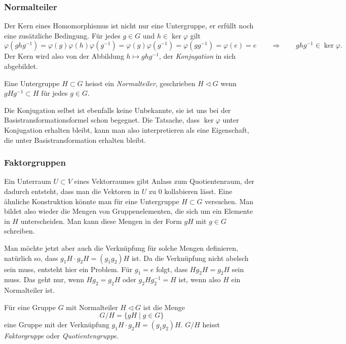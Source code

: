 \subsubsection{Normalteiler}
Der Kern eines Homomorphismus ist nicht nur eine Untergruppe, er erfüllt
noch eine zusätzliche Bedingung. 
Für jedes $g\in G$ und $h\in\ker\varphi$ gilt 
\[
\varphi(ghg^{-1})
=
\varphi(g)\varphi(h)\varphi(g^{-1})
=
\varphi(g)\varphi(g^{-1})
=
\varphi(gg^{-1})
=
\varphi(e)
=
e
\qquad\Rightarrow\qquad
ghg^{-1}\in\ker\varphi.
\]
Der Kern wird also von der Abbildung $h\mapsto ghg^{-1}$,
der {\em Konjugation} in sich abgebildet.

\begin{definition}
Eine Untergruppe $H \subset G$ heisst ein {\em Normalteiler},
geschrieben $H \triangleleft G$
wenn $gHg^{-1}\subset H$ für jedes $g\in G$.
\end{definition}

Die Konjugation selbst ist ebenfalls keine Unbekannte, sie ist uns
bei der Basistransformationsformel schon begegnet.
Die Tatsache, dass $\ker\varphi$ unter Konjugation erhalten bleibt,
kann man also interpretieren als eine Eigenschaft, die unter
Basistransformation erhalten bleibt.

\subsubsection{Faktorgruppen}
Ein Unterraum $U\subset V$ eines Vektorraumes gibt Anlass zum
Quotientenraum, der dadurch entsteht, dass man die Vektoren in $U$
zu $0$ kollabieren lässt.
Eine ähnliche Konstruktion könnte man für eine Untergruppe $H \subset G$
versuchen.
Man bildet also wieder die Mengen von Gruppenelementen, die sich um
ein Elemente in $H$ unterscheiden.
Man kann diese Mengen in der Form $gH$ mit $g\in G$ schreiben.

Man möchte jetzt aber auch die Verknüpfung für solche Mengen 
definieren, natürlich so, dass $g_1H\cdot g_2H = (g_1g_2)H$ ist.
Da die Verknüpfung nicht abelsch sein muss, entsteht hier
ein Problem.
Für $g_1=e$ folgt, dass $Hg_2H=g_2H$ sein muss.
Das geht nur, wenn $Hg_2=g_2H$ oder $g_2Hg_2^{-1}=H$ ist, wenn
also $H$ ein Normalteiler ist.

\begin{definition}
Für eine Gruppe $G$ mit Normalteiler  $H\triangleleft G$ ist die
Menge
\[
G/H = \{ gH \;|\; g\in G\}
\]
eine Gruppe mit der Verknüpfung $g_1H\cdot g_2H=(g_1g_2)H$.
$G/H$ heisst {\em Faktorgruppe} oder {\em Quotientengruppe}.
%
%
\end{definition}


